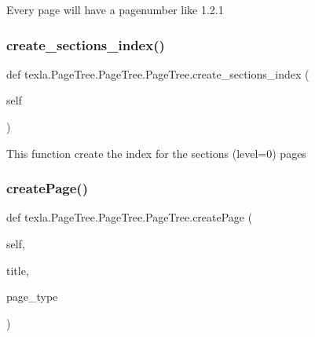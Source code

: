 \begin{DoxyVerb}Every page will have a pagenumber like 1.2.1\end{DoxyVerb}
 \hypertarget{classtexla_1_1PageTree_1_1PageTree_1_1PageTree_a3ff84eeb07714017d2048fe7a92be982}{}\label{classtexla_1_1PageTree_1_1PageTree_1_1PageTree_a3ff84eeb07714017d2048fe7a92be982} 
\subsubsection{\texorpdfstring{create\+\_\+sections\+\_\+index()}{create\_sections\_index()}}
{\footnotesize\ttfamily def texla.\+Page\+Tree.\+Page\+Tree.\+Page\+Tree.\+create\+\_\+sections\+\_\+index (\begin{DoxyParamCaption}\item[{}]{self }\end{DoxyParamCaption})}

\begin{DoxyVerb}This function create the index for the
sections (level=0) pages\end{DoxyVerb}
 \hypertarget{classtexla_1_1PageTree_1_1PageTree_1_1PageTree_a9df0c1cd2ebc4c0e0af693c49c084324}{}\label{classtexla_1_1PageTree_1_1PageTree_1_1PageTree_a9df0c1cd2ebc4c0e0af693c49c084324} 
\subsubsection{\texorpdfstring{create\+Page()}{createPage()}}
{\footnotesize\ttfamily def texla.\+Page\+Tree.\+Page\+Tree.\+Page\+Tree.\+create\+Page (\begin{DoxyParamCaption}\item[{}]{self,  }\item[{}]{title,  }\item[{}]{page\+\_\+type }\end{DoxyParamCaption})}

